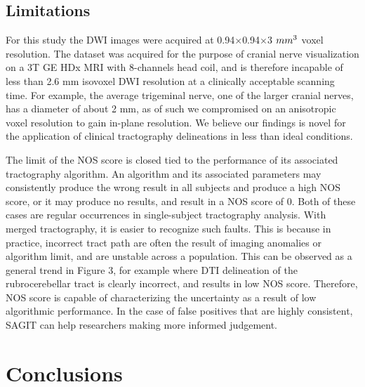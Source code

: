 \subsection{Limitations}
For this study the DWI images were acquired at 0.94$\times$0.94$\times$3 $mm\textsuperscript{3}$ voxel resolution. The dataset was acquired for the purpose of cranial nerve visualization on a 3T GE HDx MRI with 8-channels head coil, and is therefore incapable of less than 2.6 mm isovoxel DWI resolution at a clinically acceptable scanning time. For example, the average trigeminal nerve, one of the larger cranial nerves, has a diameter of about 2 mm, as of such we compromised on an anisotropic voxel resolution to gain in-plane resolution. We believe our findings is novel for the application of clinical tractography delineations in less than ideal conditions. 

The limit of the NOS score is closed tied to the performance of its associated tractography algorithm. An algorithm and its associated parameters may consistently produce the wrong result in all subjects and produce a high NOS score, or it may produce no results, and result in a NOS score of 0. Both of these cases are regular occurrences in single-subject tractography analysis. With merged tractography, it is easier to recognize such faults. This is because in practice, incorrect tract path are often the result of imaging anomalies or algorithm limit, and are unstable across a population. This can be observed as a general trend in Figure 3, for example where DTI delineation of the rubrocerebellar tract is clearly incorrect, and results in low NOS score. Therefore, NOS score is capable of characterizing the uncertainty as a result of low algorithmic performance. In the case of false positives that are highly consistent, SAGIT can help researchers making more informed judgement.

\section{Conclusions}

